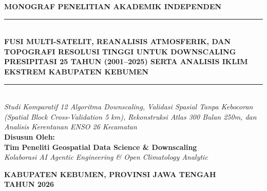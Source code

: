 \documentclass[11pt,a4paper,titlepage]{article}
\begin{document}
\hypersetup{pageanchor=false}
\begin{titlepage}
    \centering
    \vspace*{1.0cm}
    
    {\Large \textbf{MONOGRAF PENELITIAN AKADEMIK INDEPENDEN}}\\[0.8cm]
    \rule{\linewidth}{1.5pt}\\[0.5cm]
    {\LARGE \textbf{\color{navyblue} FUSI MULTI-SATELIT, REANALISIS ATMOSFERIK, DAN TOPOGRAFI RESOLUSI TINGGI UNTUK DOWNSCALING PRESIPITASI 25 TAHUN (2001--2025) SERTA ANALISIS IKLIM EKSTREM KABUPATEN KEBUMEN}}\\[0.5cm]
    \rule{\linewidth}{1.5pt}\\[1.0cm]
    
    \textit{Studi Komparatif 12 Algoritma Downscaling, Validasi Spasial Tanpa Kebocoran (Spatial Block Cross-Validation 5 km), Rekonstruksi Atlas 300 Bulan 250m, dan Analisis Kerentanan ENSO 26 Kecamatan}\\[1.8cm]
    
    \textbf{Disusun Oleh:}\\[0.3cm]
    {\large \textbf{Tim Peneliti Geospatial Data Science \& Downscaling}}\\[0.2cm]
    \textit{Kolaborasi AI Agentic Engineering \& Open Climatology Analytic}\\[2.5cm]
    
    \vfill
    
    {\large \textbf{KABUPATEN KEBUMEN, PROVINSI JAWA TENGAH}}\\[0.2cm]
    {\large \textbf{TAHUN 2026}}
\end{titlepage}

\newpage
\hypersetup{pageanchor=true}
\tableofcontents
\newpage
\listoffigures
\newpage
\listoftables
\newpage

\end{document}

